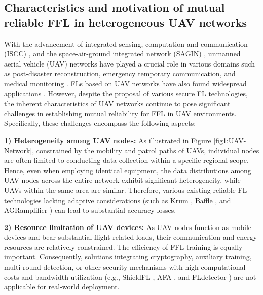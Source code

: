 \documentclass[lettersize,journal]{IEEEtran}
\begin{document}
\subsection{Characteristics and motivation of mutual reliable FFL in heterogeneous UAV networks}
With the advancement of integrated sensing, computation and communication (ISCC) \cite{he2023integrated}, and the space-air-ground integrated network (SAGIN) \cite{shen2023survey}, unmanned aerial vehicle (UAV) networks have played a crucial role in various domains such as post-disaster reconstruction, emergency temporary communication, and medical monitoring \cite{lu2023uav}. FLs based on UAV networks have also found widespread applications \cite{ETT1, ETT3, pandya2023federated}. However, despite the proposal of various secure FL technologies, the inherent characteristics of UAV networks continue to pose significant challenges in establishing mutual reliability for FFL in UAV environments. Specifically, these challenges encompass the following aspects:

\textbf{1) Heterogeneity among UAV nodes:} As illustrated in Figure \ref{fig1:UAV-Network}, constrained by the mobility and patrol paths of UAVs, individual nodes are often limited to conducting data collection within a specific regional scope. Hence, even when employing identical equipment, the data distributions among UAV nodes across the entire network exhibit significant heterogeneity, while UAVs within the same area are similar. Therefore, various existing reliable FL technologies lacking adaptive considerations (such as Krum \cite{blanchard2017machine-krum}, Baffle \cite{andreina2021baffle}, and AGRamplifier \cite{gong2023agramplifier}) can lead to substantial accuracy losses.

\textbf{2) Resource limitation of UAV devices:} As UAV nodes function as mobile devices and bear substantial flight-related loads, their communication and energy resources are relatively constrained. The efficiency of FFL training is equally important. Consequently, solutions integrating cryptography, auxiliary training, multi-round detection, or other security mechanisms with high computational costs and bandwidth utilization (e.g., ShieldFL \cite{ma2022shieldfl}, AFA \cite{munoz2019byzantine-AFA}, and FLdetector \cite{zhang2022fldetector}) are not applicable for real-world deployment.
\end{document}

